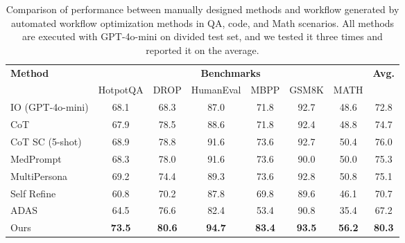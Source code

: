 \begin{table}[!htbp]
\caption{Comparison of performance between manually designed methods and workflow generated by automated workflow optimization methods in QA, code, and Math scenarios. All methods are executed with GPT-4o-mini on divided test set, and we tested it three times and reported it on the average.}
\scriptsize
\renewcommand\tabcolsep{3.2pt}
\renewcommand\arraystretch{1.2}
\small
\setlength{\abovecaptionskip}{0.1cm}
\setlength{\belowcaptionskip}{-0.2cm}
\centering
\begin{tabular}{l|cccccc|c}
\hline

\hline

\hline

\hline
\multirow{2}{*}{\textbf{Method}} & \multicolumn{6}{c|}{\textbf{Benchmarks}}  & \multirow{2}{*}{\textbf{Avg.}}\\
& HotpotQA & DROP & HumanEval & MBPP & GSM8K & MATH & \\
\hline

\hline
IO (GPT-4o-mini) & 68.1 & 68.3 &  87.0 & 71.8 & 92.7 & 48.6 & 72.8 \\
CoT~\citep{wei2022COT} & 67.9 & 78.5 &  88.6 & 71.8 & 92.4 &  48.8 & 74.7 \\
CoT SC (5-shot)~\citep{wang2022COTSC} & 68.9 & 78.8 & 91.6 & 73.6 & 92.7 & 50.4 & 76.0 \\
MedPrompt~\citep{nori2023medprompt} & 68.3 & 78.0 & 91.6 & 73.6 & 90.0 & 50.0 & 75.3 \\ 
MultiPersona~\citep{wang2023multipersona} & 69.2 & 74.4 & 89.3 & 73.6 & 92.8 & 50.8 & 75.1\\
Self Refine~\citep{madaan2023self} & 60.8 & 70.2 & 87.8 & 69.8 & 89.6 & 46.1 & 70.7\\
\hline
ADAS~\citep{hu2024automated} & 64.5 & 76.6 & 82.4 & 53.4 & 90.8 & 35.4 &  67.2\\
\rowcolor[gray]{.8}
Ours & \textbf{73.5} & \textbf{80.6} & \textbf{94.7} & \textbf{83.4} & \textbf{93.5} & \textbf{56.2} & \textbf{80.3} \\
\hline

\hline

\hline

\hline
\end{tabular}
\label{tab:main result}
\vspace{-3mm}
\end{table}


